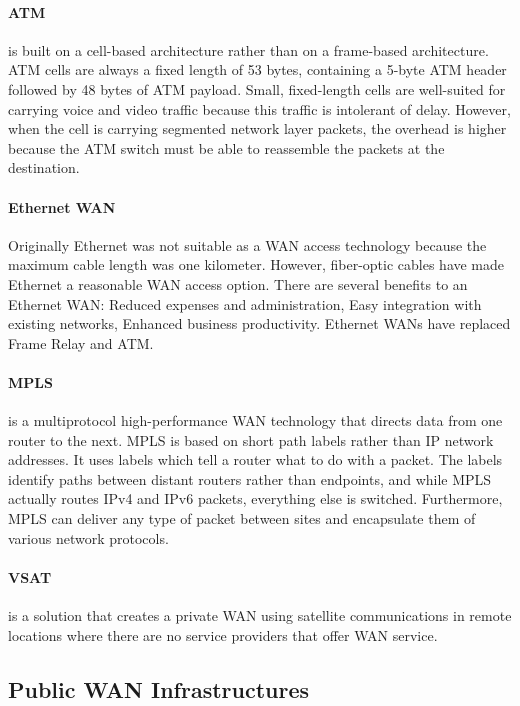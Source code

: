 \paragraph{ATM} is built on a cell-based architecture rather than on a frame-based architecture. ATM cells are always a fixed length of 53 bytes, containing a 5-byte ATM header followed by 48 bytes of ATM payload. Small, fixed-length cells are well-suited for carrying voice and video traffic because this traffic is intolerant of delay. However, when the cell is carrying segmented network layer packets, the overhead is higher because the ATM switch must be able to reassemble the packets at the destination. 

\paragraph{Ethernet WAN}Originally Ethernet was not suitable as a WAN access technology because the maximum cable length was one kilometer. However, fiber-optic cables have made Ethernet a reasonable WAN access option. There are several benefits to an Ethernet WAN: Reduced expenses and administration, Easy integration with existing networks, Enhanced business productivity. Ethernet WANs have replaced Frame Relay and ATM.

\paragraph{MPLS} is a multiprotocol high-performance WAN technology that directs data from one router to the next. MPLS is based on short path labels rather than IP network addresses.  It uses labels which tell a router what to do with a packet. The labels identify paths between distant routers rather than endpoints, and while MPLS actually routes IPv4 and IPv6 packets, everything else is switched. Furthermore, MPLS can deliver any type of packet between sites and encapsulate them of various network protocols.

\paragraph{VSAT} is a solution that creates a private WAN using satellite communications in remote locations where there are no service providers that offer WAN service.

\subsection{Public WAN Infrastructures}

